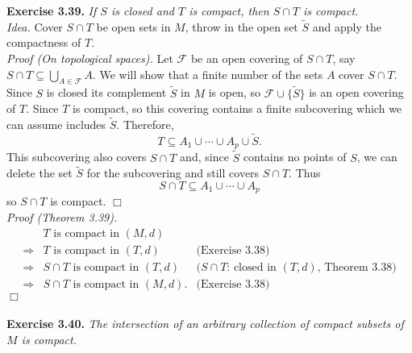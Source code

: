 \documentclass{article}
\begin{document}



\textbf{Exercise 3.39.}
\emph{If $S$ is closed and $T$ is compact, then $S \cap T$ is compact.} \\

\emph{Idea.}
Cover $S \cap T$ be open sets in $M$, throw in the open set $\widetilde{S}$
and apply the compactness of $T$. \\

\emph{Proof (On topological spaces).}
Let $\mathscr{F}$ be an open covering of $S \cap T$, say
$S \cap T \subseteq \bigcup_{A \in \mathscr{F}}A$.
We will show that a finite number of the sets $A$ cover $S \cap T$.
Since $S$ is closed its complement $\widetilde{S}$ in $M$ is open,
so $\mathscr{F} \cup \{ \widetilde{S} \}$ is an open covering of $T$.
Since $T$ is compact, so this covering contains a finite subcovering
which we can assume includes $\widetilde{S}$.
Therefore,
$$T \subseteq A_1 \cup \cdots \cup A_p \cup \widetilde{S}.$$
This subcovering also covers $S \cap T$ and, since $\widetilde{S}$ contains no points of $S$,
we can delete the set $\widetilde{S}$ for the subcovering and still covers $S \cap T$.
Thus
$$S \cap T \subseteq A_1 \cup \cdots \cup A_p$$
so $S \cap T$ is compact.
$\Box$ \\

\emph{Proof (Theorem 3.39).}
\begin{align*}
&\text{$T$ is compact in $(M,d)$} \\
\Longrightarrow&
\text{$T$ is compact in $(T,d)$}
  &\text{(Exercise 3.38)} \\
\Longrightarrow&
\text{$S \cap T$ is compact in $(T,d)$}
  &\text{($S \cap T$: closed in $(T,d)$, Theorem 3.38)} \\
\Longrightarrow&
\text{$S \cap T$ is compact in $(M,d)$}.
  &\text{(Exercise 3.38)}
\end{align*}
$\Box$ \\\\






\textbf{Exercise 3.40.}
\emph{The intersection of an arbitrary collection of compact subsets of $M$ is compact.} \\
\end{document}
